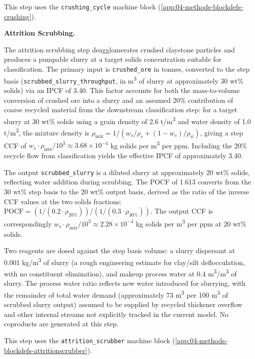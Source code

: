 This step uses the \texttt{crushing\_cycle} machine block (\ref{app:04-methods-blockdefs-crushing}).

\medskip
\noindent\textbf{Attrition Scrubbing.}\quad

The attrition scrubbing step deagglomerates crushed claystone particles and produces a pumpable slurry at a target solids concentration suitable for classification. The primary input is \texttt{crushed\_ore} in tonnes, converted to the step basis (\texttt{scrubbed\_slurry\_throughput}, in m\textsuperscript{3} of slurry at approximately 30 wt\% solids) via an IPCF of 3.40. This factor accounts for both the mass-to-volume conversion of crushed ore into a slurry and an assumed 20\% contribution of coarse recycled material from the downstream classification step: for a target slurry at 30 wt\% solids using a grain density of 2.6 t/m\textsuperscript{3} and water density of 1.0 t/m\textsuperscript{3}, the mixture density is $\rho_{\text{mix}} = 1/(w_s/\rho_s + (1-w_s)/\rho_w)$, giving a step CCF of $w_s \cdot \rho_{\text{mix}} / 10^3 \approx 3.68 \times 10^{-4}$ kg solids per m\textsuperscript{3} per ppm. Including the 20\% recycle flow from classification yields the effective IPCF of approximately 3.40.

The output \texttt{scrubbed\_slurry} is a diluted slurry at approximately 20 wt\% solids, reflecting water addition during scrubbing. The POCF of 1.613 converts from the 30 wt\% step basis to the 20 wt\% output basis, derived as the ratio of the inverse CCF values at the two solids fractions: $\text{POCF} = (1/(0.2 \cdot \rho_{20\%})) / (1/(0.3 \cdot \rho_{30\%}))$. The output CCF is correspondingly $w_s \cdot \rho_{\text{mix}} / 10^3 \approx 2.28 \times 10^{-4}$ kg solids per m\textsuperscript{3} per ppm at 20 wt\% solids.

Two reagents are dosed against the step basis volume: a slurry dispersant at 0.001 kg/m\textsuperscript{3} of slurry (a rough engineering estimate for clay/silt deflocculation, with no constituent elimination), and makeup process water at 0.4 m\textsuperscript{3}/m\textsuperscript{3} of slurry. The process water ratio reflects new water introduced for slurrying, with the remainder of total water demand (approximately 73 m\textsuperscript{3} per 100 m\textsuperscript{3} of scrubbed slurry output) assumed to be supplied by recycled thickener overflow and other internal streams not explicitly tracked in the current model. No coproducts are generated at this step.

This step uses the \texttt{attrition\_scrubber} machine block (\ref{app:04-methods-blockdefs-attritionscrubber}).

